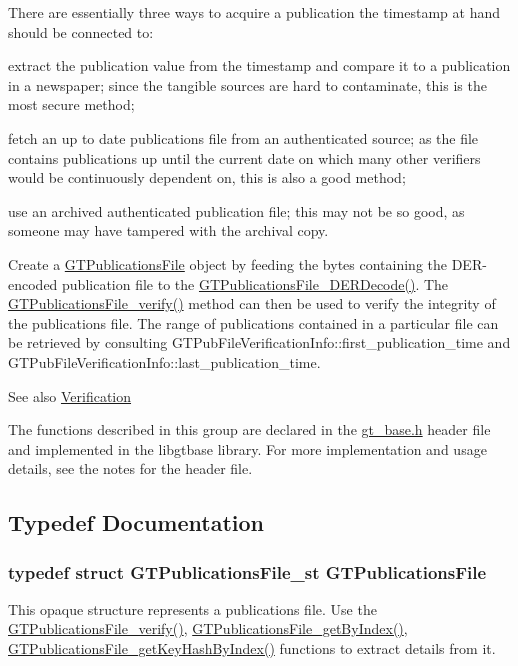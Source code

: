 There are essentially three ways to acquire a publication the timestamp at hand should be connected to:
\begin{DoxyItemize}
\item extract the publication value from the timestamp and compare it to a publication in a newspaper; since the tangible sources are hard to contaminate, this is the most secure method;
\item fetch an up to date publications file from an authenticated source; as the file contains publications up until the current date on which many other verifiers would be continuously dependent on, this is also a good method;
\item use an archived authenticated publication file; this may not be so good, as someone may have tampered with the archival copy.
\end{DoxyItemize}

Create a \hyperlink{group__publications_gacf561fdbce4067eb94bd9761a71e7e5a}{GTPublicationsFile} object by feeding the bytes containing the DER-\/encoded publication file to the \hyperlink{group__publications_ga2f0755e9ef1686ca255098a9c3f2de8a}{GTPublicationsFile\_\-DERDecode()}. The \hyperlink{group__publications_gac3eccc436ce6e5114346b9135b616fc9}{GTPublicationsFile\_\-verify()} method can then be used to verify the integrity of the publications file. The range of publications contained in a particular file can be retrieved by consulting GTPubFileVerificationInfo::first\_\-publication\_\-time and GTPubFileVerificationInfo::last\_\-publication\_\-time.

\begin{DoxySeeAlso}{See also}
\hyperlink{group__verification}{Verification}
\end{DoxySeeAlso}
The functions described in this group are declared in the {\ttfamily \hyperlink{gt__base_8h}{gt\_\-base.h}} header file and implemented in the {\ttfamily libgtbase} library. For more implementation and usage details, see the notes for the header file. 

\subsection{Typedef Documentation}
\hypertarget{group__publications_gacf561fdbce4067eb94bd9761a71e7e5a}{
\subsubsection[{GTPublicationsFile}]{\setlength{\rightskip}{0pt plus 5cm}typedef struct GTPublicationsFile\_\-st {\bf GTPublicationsFile}}}
\label{group__publications_gacf561fdbce4067eb94bd9761a71e7e5a}
This opaque structure represents a publications file. Use the \hyperlink{group__publications_gac3eccc436ce6e5114346b9135b616fc9}{GTPublicationsFile\_\-verify()}, \hyperlink{group__publications_gac7154e5bda48840a583100dfa5a8393b}{GTPublicationsFile\_\-getByIndex()}, \hyperlink{group__publications_ga37390311c583fe0ecc6871db4b4b8f05}{GTPublicationsFile\_\-getKeyHashByIndex()} functions to extract details from it. 

